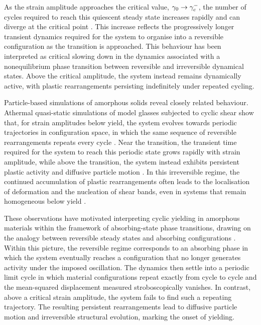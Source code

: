 As the strain amplitude approaches the critical value, $\gamma_0\to\gamma_c^-$, the number of cycles required to reach this quiescent steady state increases rapidly and can diverge at the critical point \cite{Regev_onset_2013,kawasakiMacroscopicYieldingJammed2016}. This increase reflects the progressively longer transient dynamics required for the system to organise into a reversible configuration as the transition is approached. This behaviour has been interpreted as critical slowing down in the dynamics associated with a nonequilibrium phase transition between reversible and irreversible dynamical states. Above the critical amplitude, the system instead remains dynamically active, with plastic rearrangements persisting indefinitely under repeated cycling.

Particle-based simulations of amorphous solids reveal closely related behaviour. Athermal quasi-static simulations of model glasses subjected to cyclic shear show that, for strain amplitudes below yield, the system evolves towards periodic trajectories in configuration space, in which the same sequence of reversible rearrangements repeats every cycle \cite{Fiocco2013,Regev_onset_2013,Leishangthem2017,nessAbsorbingStateTransitionsGranular2020}. Near the transition, the transient time required for the system to reach this periodic state grows rapidly with strain amplitude, while above the transition, the system instead exhibits persistent plastic activity and diffusive particle motion \cite{Regev_onset_2013,kawasakiMacroscopicYieldingJammed2016}. In this irreversible regime, the continued accumulation of plastic rearrangements often leads to the localisation of deformation and the nucleation of shear bands, even in systems that remain homogeneous below yield \cite{Leishangthem2017,bhaumikRoleAnnealingDetermining2021}.

These observations have motivated interpreting cyclic yielding in amorphous materials within the framework of absorbing-state phase transitions, drawing on the analogy between reversible steady states and absorbing configurations \cite{nessAbsorbingStateTransitionsGranular2020,Cort2008,himanagamanasaExperimentalSignaturesNonequilibrium2014}. Within this picture, the reversible regime corresponds to an absorbing phase in which the system eventually reaches a configuration that no longer generates activity under the imposed oscillation. The dynamics then settle into a periodic limit cycle in which material configurations repeat exactly from cycle to cycle and the mean-squared displacement measured stroboscopically vanishes. In contrast, above a critical strain amplitude, the system fails to find such a repeating trajectory. The resulting persistent rearrangements lead to diffusive particle motion and irreversible structural evolution, marking the onset of yielding. 

